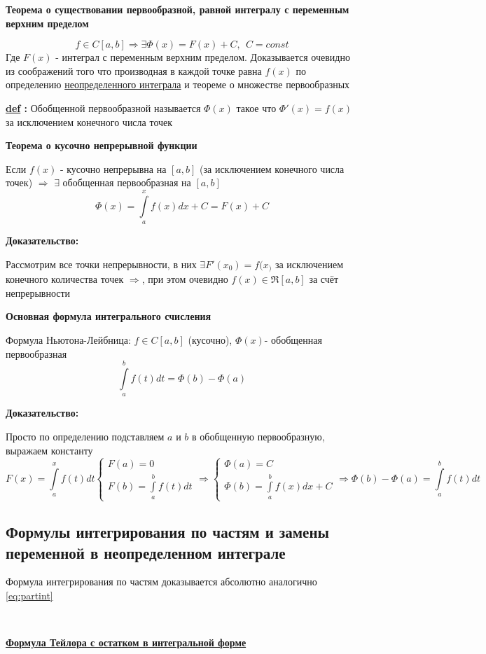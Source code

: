 \documentclass[a4paper,11pt]{article}
\newcounter{lecture}
\newcommand{\Def}[1]{ 
\noindent\makebox[\linewidth]{\rule{\textwidth}{1pt}} 

 \noindent \textbf{\underline{def} :}
#1 

\noindent\makebox[\linewidth]{\rule{\textwidth}{1pt}} }
\newcommand{\Theorem}[3]{ 
\noindent\makebox[\linewidth]{\rule{\textwidth}{2pt}}

\noindent \textbf{#1} 
 
 #2
 
 \noindent\makebox[\linewidth]{\rule{\textwidth}{2pt}}
 \noindent \textbf{Доказательство:}
 
 #3
 
 \noindent\makebox[\linewidth]{\rule{\textwidth}{2pt}}
 }
\newcommand{\ubf}[1]{ \noindent\textbf{\underline{#1}}}
\begin{document}
	\begin{center}
\textbf{	Теорема о существовании первообразной, равной 
	интегралу с переменным верхним пределом}
	\end{center}

\[
f \in C[a, b] \Rightarrow \exists \Phi(x) = F(x) + C, \ \ C = const
\]
Где $F(x)$ - интеграл с переменным верхним пределом. Доказывается очевидно из соображений того что производная в каждой точке равна $f(x)$ по определению \hyperref[def:int]{неопределенного интеграла} и теореме о множестве первообразных

\Def
{ Обобщенной первообразной называется $\Phi(x)$ такое что $\Phi'(x) = f(x)$ за исключением конечного числа точек
}

\Theorem
{
	Теорема о кусочно непрерывной функции
}
{
	Если $f(x)$ - кусочно непрерывна на $[a, b]$ (за исключением конечного числа точек) $\Rightarrow$ $\exists$ обобщенная первообразная на $[a, b]$
	\[
	\Phi(x) = \int\limits_a^x f(x)dx + C = F(x) + C
	\]
}
{
	Рассмотрим все точки непрерывности, в них $\exists F'(x_0) = f(x_)$ за исключением конечного количества точек $\Rightarrow$, при этом очевидно $f(x) \in \Re[a, b]$ за счёт непрерывности
}

\Theorem
{
Основная формула интегрального счисления 
}
{
Формула Ньютона-Лейбница:
$f \in C[a, b]$ (кусочно), $\Phi(x) $- обобщенная первообразная  
\[
\int\limits_a^b f(t)dt = \Phi(b) - \Phi(a)
\]
}
{
Просто по определению подставляем $a$ и $b$ в обобщенную первообразную, выражаем константу
\[ F(x) = \int\limits_a^x f(t)dt
\begin{cases}
F(a) = 0 \\
F(b) = \int\limits_a^b f(t)dt
\end{cases}
\Rightarrow
\begin{cases}
	\Phi(a) = C \\
	\Phi(b) = \int\limits_a^b f(x)dx + C
\end{cases}
 \Rightarrow \Phi(b) - \Phi(a) = \int\limits_a^b f(t)dt
\]
}
\setcounter{lecture}{7}
\subsection{Формулы интегрирования по частям и замены переменной в неопределенном интеграле}

Формула интегрирования по частям доказывается абсолютно аналогично \eqref{eq:partint}

\


\ubf{Формула Тейлора с остатком в интегральной форме}
\end{document}
